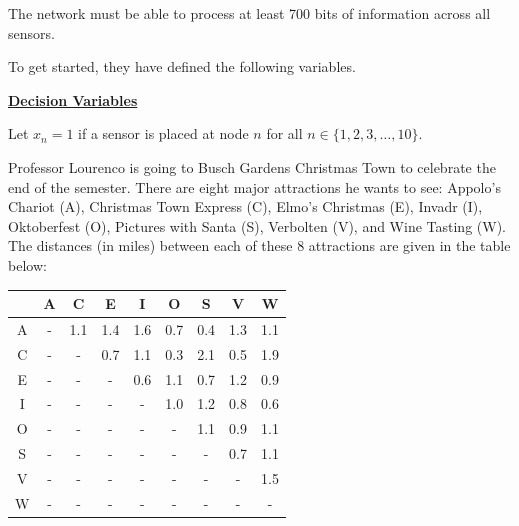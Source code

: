 \documentclass[12pt]{exam}
\begin{document}
\begin{questions}
The network must be able to process at least 700 bits of information across all sensors.

To get started, they have defined the following variables.

\textbf{\underline{Decision Variables}}

Let $x_n = 1$ if a sensor is placed at node $n$ for all $n \in \{1,2,3,\hdots,10\}$.


\newpage

\question Professor Lourenco is going to Busch Gardens Christmas Town to celebrate the end of the semester. There are eight major attractions he wants to see: Appolo's Chariot (A), Christmas Town Express (C), Elmo's Christmas (E), Invadr (I), Oktoberfest (O), Pictures with Santa (S), Verbolten (V), and Wine Tasting (W). The distances (in miles) between each of these 8 attractions are given in the table below:

\begin{center}
\begin{tabular}{ccccccccc} 
  & A & C   & E   & I   & O   & S   & V    & W  \\\hline
A & - & 1.1 & 1.4 & 1.6 & 0.7 & 0.4 & 1.3  & 1.1 \\
C & - & -   & 0.7 & 1.1 & 0.3 & 2.1 & 0.5 & 1.9 \\
E & - & -   & -   & 0.6 & 1.1 & 0.7 & 1.2 & 0.9 \\
I & - & -   & -   & -   & 1.0 & 1.2 & 0.8 & 0.6 \\
O & - & -   & -   & -   & -   & 1.1 & 0.9 & 1.1 \\
S & - & -   & -   & -   & -   & -   & 0.7 & 1.1 \\
V & - & -   & -   & -   & -   & -   & -   & 1.5 \\
W & - & -   & -   & -   & -   & -   & -   & - \\
\end{tabular}
\end{center}


\end{questions}
\end{document}
